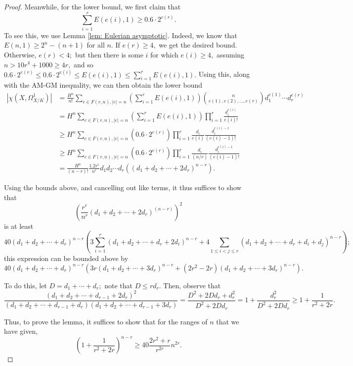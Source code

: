\documentclass[10pt,a4paper]{amsart}
\begin{document}
\begin{proof}
\par Meanwhile, for the lower bound, we first claim that $$\sum\limits_{i=1}^r E(e(i), 1) \geq 0.6 \cdot 2^{e(r)}.$$ To see this, we use Lemma \ref{lem: Eulerian asymptotic}. Indeed, we know that $E(n, 1) \geq 2^n - (n+1)$ for all $n.$ If $e(r) \geq 4,$ we get the desired bound. Otherwise, $e(r) < 4;$ but then there is some $i$ for which $e(i) \geq 4,$ assuming $n > 10r^4 + 1000 \geq 4r,$ and so $0.6 \cdot 2^{e(r)} \leq 0.6 \cdot 2^{e(i)} \leq E(e(i), 1) \leq \sum\limits_{i=1}^r E(e(i), 1).$ Using this, along with the AM-GM inequality, we can then obtain the lower bound \begin{align*} |\chi(X, \Omega^1_{X/K})| & = \frac{H^n}{n!} \sum\limits_{e \in F(r, n), |e| = n} \left(\sum\limits_{i=1}^r E(e(i), 1)\right)\binom{n}{e(1), e(2), \ldots, e(r)}d_1^{e(1)} \cdots d_r^{e(r)} \\ & = H^n \sum\limits_{e \in F(r, n), |e| = n} \left(\sum\limits_{i=1}^r E(e(i), 1)\right)\prod\limits_{i=1}^r \frac{d_i^{e(i)}}{e(i)!} \\ & \geq H^n \sum\limits_{e \in F(r, n), |e| = n} \left(0.6 \cdot 2^{e(r)}\right)\prod\limits_{i=1}^r \frac{d_i}{e(i) }\frac{d_i^{e(i) - 1}}{(e(i) - 1)!} \\ & \geq H^n \sum\limits_{e \in F(r, n), |e| = n} \left(0.6 \cdot 2^{e(r)}\right)\prod\limits_{i=1}^r \frac{d_i}{(n/r)} \frac{d_i^{e(i) - 1}}{(e(i) - 1)!} \\ & = \frac{H^n}{(n-r)!}\frac{1.2 r^r}{n^r} d_1d_2 \cdots d_r \left((d_1 + d_2 + \cdots + 2d_r)^{n-r}\right).
\end{align*}
\par Using the bounds above, and cancelling out like terms, it thus suffices to show that $$\left(\frac{r^r}{n^r} (d_1 + d_2 + \cdots + 2d_r)^{(n-r)}\right)^2$$ is at least \[40 (d_1 + d_2 + \cdots + d_r)^{n-r} \left(3\sum\limits_{i=1}^r (d_1 + d_2 + \cdots + d_r + 2d_i)^{n-r} + 4\sum\limits_{1 \leq i < j \leq r} (d_1 + d_2 + \cdots + d_r + d_i + d_j)^{n-r}\right);\] this expression can be bounded above by \[40 (d_1 + d_2 + \cdots + d_r)^{n-r} \left(3r (d_1 + d_2 + \cdots + 3d_r )^{n-r} + (2r^2 - 2r) (d_1 + d_2 + \cdots + 3d_r)^{n-r}\right).\]
\par To do this, let $D = d_1 + \cdots + d_r;$ note that $D \leq rd_r.$ Then, observe that $$\frac{(d_1 + d_2 + \cdots + d_{r-1} + 2d_r)^2}{(d_1 + d_2 + \cdots + d_{r-1} + d_r)(d_1 + d_2 + \cdots + d_{r-1} + 3d_r)} = \frac{D^2 + 2Dd_r + d_r^2}{D^2 + 2Dd_r} = 1 + \frac{d_r^2}{D^2 + 2Dd_r} \geq 1 + \frac{1}{r^2 + 2r}.$$
\par Thus, to prove the lemma, it suffices to show that for the ranges of $n$ that we have given, $$\left(1 + \frac{1}{r^2 + 2r}\right)^{n-r} \geq 40\frac{2r^2 + r}{r^{2r}} n^{2r}.$$

\end{proof}
\end{document}

